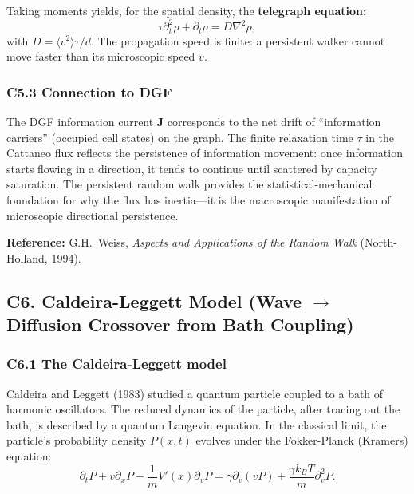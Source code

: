 \documentclass[reprint]{revtex4-2}
\begin{document}
Taking moments yields, for the spatial density, the \textbf{telegraph equation}:
\begin{equation}
\tau\partial_t^2\rho + \partial_t\rho = D\nabla^2\rho,
\end{equation}
with $D = \langle v^2\rangle\tau/d$. The propagation speed is finite: a persistent walker cannot move faster than its microscopic speed $v$.

\subsubsection{C5.3 Connection to DGF}

The DGF information current $\mathbf{J}$ corresponds to the net drift of ``information carriers'' (occupied cell states) on the graph. The finite relaxation time $\tau$ in the Cattaneo flux reflects the persistence of information movement: once information starts flowing in a direction, it tends to continue until scattered by capacity saturation. The persistent random walk provides the statistical-mechanical foundation for why the flux has inertia---it is the macroscopic manifestation of microscopic directional persistence.

\textbf{Reference:} G.H.\ Weiss, \emph{Aspects and Applications of the Random Walk} (North-Holland, 1994).

\subsection{C6. Caldeira-Leggett Model (Wave $\to$ Diffusion Crossover from Bath Coupling)}

\subsubsection{C6.1 The Caldeira-Leggett model}

Caldeira and Leggett (1983) studied a quantum particle coupled to a bath of harmonic oscillators. The reduced dynamics of the particle, after tracing out the bath, is described by a quantum Langevin equation. In the classical limit, the particle's probability density $P(x,t)$ evolves under the Fokker-Planck (Kramers) equation:
\begin{equation}
\partial_t P + v\partial_x P - \frac{1}{m}V'(x)\partial_v P = \gamma\partial_v(vP) + \frac{\gamma k_B T}{m}\partial_v^2 P.
\end{equation}
\end{document}
